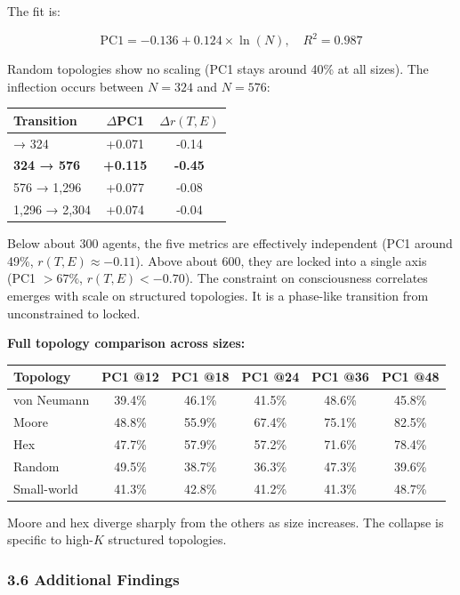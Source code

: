 \documentclass[
  11pt,
]{article}
\begin{document}
The fit is:

\[\text{PC1} = -0.136 + 0.124 \times \ln(N), \quad R^2 = 0.987\]

Random topologies show no scaling (PC1 stays around 40\% at all sizes).
The inflection occurs between \(N = 324\) and \(N = 576\):

\begin{longtable}[]{@{}lcc@{}}
\toprule\noalign{}
Transition & \(\Delta\)PC1 & \(\Delta r(T,E)\) \\
\midrule\noalign{}
\endhead
\bottomrule\noalign{}
\endlastfoot
144 → 324 & +0.071 & -0.14 \\
\textbf{324 → 576} & \textbf{+0.115} & \textbf{-0.45} \\
576 → 1,296 & +0.077 & -0.08 \\
1,296 → 2,304 & +0.074 & -0.04 \\
\end{longtable}

Below about 300 agents, the five metrics are effectively independent
(PC1 around 49\%, \(r(T,E) \approx -0.11\)). Above about 600, they are
locked into a single axis (PC1 \(> 67\%\), \(r(T,E) < -0.70\)). The
constraint on consciousness correlates emerges with scale on structured
topologies. It is a phase-like transition from unconstrained to locked.

\textbf{Full topology comparison across sizes:}

\begin{longtable}[]{@{}lccccc@{}}
\toprule\noalign{}
Topology & PC1 @12 & PC1 @18 & PC1 @24 & PC1 @36 & PC1 @48 \\
\midrule\noalign{}
\endhead
\bottomrule\noalign{}
\endlastfoot
von Neumann & 39.4\% & 46.1\% & 41.5\% & 48.6\% & 45.8\% \\
Moore & 48.8\% & 55.9\% & 67.4\% & 75.1\% & 82.5\% \\
Hex & 47.7\% & 57.9\% & 57.2\% & 71.6\% & 78.4\% \\
Random & 49.5\% & 38.7\% & 36.3\% & 47.3\% & 39.6\% \\
Small-world & 41.3\% & 42.8\% & 41.2\% & 41.3\% & 48.7\% \\
\end{longtable}

Moore and hex diverge sharply from the others as size increases. The
collapse is specific to high-\(K\) structured topologies.

\subsubsection{3.6 Additional Findings}\label{additional-findings}
\end{document}
